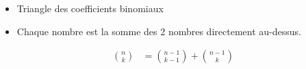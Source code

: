 \documentclass[10pt, french]{article}
\begin{document}
\begin{multicols*}{2}
\begin{minipage}{0.4\linewidth}
\begin{tikzpicture}[x=0.75pt,y=0.75pt,yscale=-1,xscale=1]
\end{tikzpicture}
\end{minipage}
\begin{minipage}{0.6\linewidth}

\begin{itemize}
	\item	Triangle des coefficients binomiaux
	\item 	Chaque nombre est la somme des 2 nombres directement au-dessus.
\end{itemize}

\begin{align*}
	\binom{n}{k}
		&=	\binom{n - 1}{k - 1} + \binom{n - 1}{k}		\\
\end{align*}
\end{minipage}

\end{multicols*}
\end{document}
